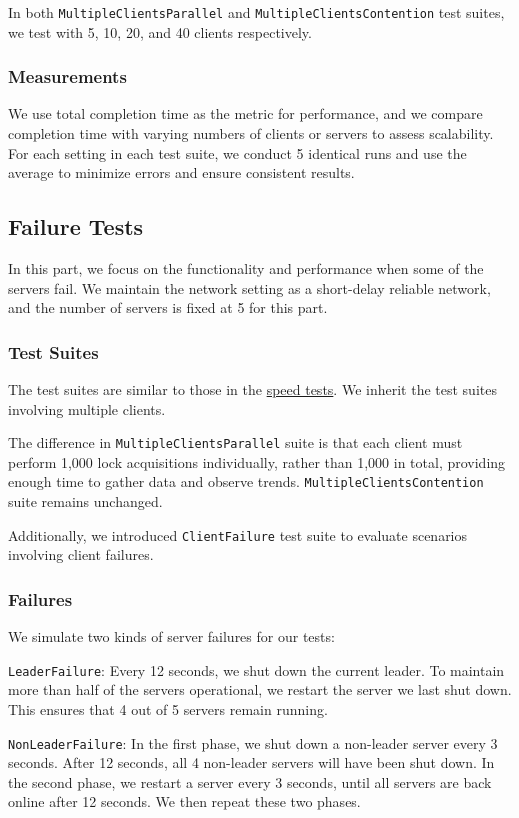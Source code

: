 \documentclass[11pt,a4paper]{article}
\begin{document}
In both \verb|MultipleClientsParallel| and \verb|MultipleClientsContention| test suites, we test with 5, 10, 20, and 40 clients respectively.

\subsubsection{Measurements}
We use total completion time as the metric for performance, and we compare completion time with varying numbers of clients or servers to assess scalability. For each setting in each test suite, we conduct 5 identical runs and use the average to minimize errors and ensure consistent results.

\subsection{Failure Tests}\label{subsecFailure}
In this part, we focus on the functionality and performance when some of the servers fail. We maintain the network setting as a short-delay reliable network, and the number of servers is fixed at 5 for this part.

\subsubsection{Test Suites}
The test suites are similar to those in the \hyperref[speedSuites]{speed tests}. We inherit the test suites involving multiple clients.

The difference in \verb|MultipleClientsParallel| suite is that each client must perform 1,000 lock acquisitions individually, rather than 1,000 in total, providing enough time to gather data and observe trends.
\verb|MultipleClientsContention| suite remains unchanged.

Additionally, we introduced \verb|ClientFailure| test suite to evaluate scenarios involving client failures.
\subsubsection{Failures}\label{failureDescription}
We simulate two kinds of server failures for our tests:

\verb|LeaderFailure|: Every 12 seconds, we shut down the current leader. To maintain more than half of the servers operational, we restart the server we last shut down. This ensures that 4 out of 5 servers remain running.

\verb|NonLeaderFailure|: In the first phase, we shut down a non-leader server every 3 seconds. After 12 seconds, all 4 non-leader servers will have been shut down. In the second phase, we restart a server every 3 seconds, until all servers are back online after 12 seconds. We then repeat these two phases.
\end{document}

